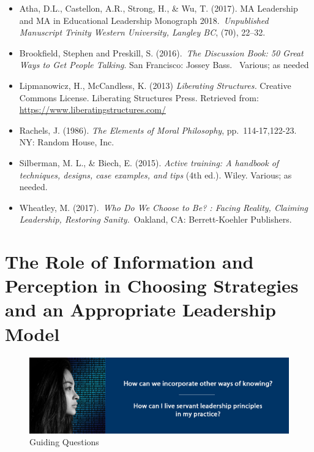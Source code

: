 \documentclass[
]{book}
\providecommand{\tightlist}{%
  \setlength{\itemsep}{0pt}\setlength{\parskip}{0pt}}
\begin{document}
\begin{itemize}
\tightlist
\item
  Atha, D.L., Castellon, A.R., Strong, H., \& Wu, T. (2017). MA Leadership and MA in Educational Leadership Monograph 2018.~\emph{Unpublished Manuscript Trinity Western University, Langley BC}, (70), 22--32.\\
\item
  Brookfield, Stephen and Preskill, S. (2016).~\emph{The Discussion Book: 50 Great Ways to Get People Talking}. San Francisco: Jossey Bass. ~Various; as needed\\
\item
  Lipmanowicz, H., McCandless, K. (2013) \emph{Liberating Structures.} Creative Commons License. Liberating Structures Press. Retrieved from: \url{https://www.liberatingstructures.com/}\\
\item
  Rachels, J. (1986). \emph{The Elements of Moral Philosophy}, pp.~114-17,122-23. NY: Random House, Inc.\\
\item
  Silberman, M. L., \& Biech, E. (2015). \emph{Active training: A handbook of techniques, designs, case examples, and tips} (4th ed.). Wiley. Various; as needed.\\
\item
  Wheatley, M. (2017).~\emph{Who Do We Choose to Be? : Facing Reality, Claiming Leadership, Restoring Sanity.}~Oakland, CA: Berrett-Koehler Publishers.
\end{itemize}

\hypertarget{the-role-of-information-and-perception-in-choosing-strategies-and-an-appropriate-leadership-model}{%
\chapter{The Role of Information and Perception in Choosing Strategies and an Appropriate Leadership Model}\label{the-role-of-information-and-perception-in-choosing-strategies-and-an-appropriate-leadership-model}}

\begin{figure}
\centering
\includegraphics{assets/unit7/BannerUnit7.jpg}
\caption{Guiding Questions}
\end{figure}
\end{document}

